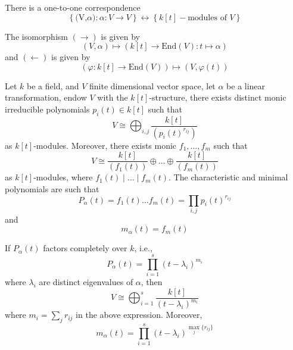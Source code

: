 \documentclass[openany]{book}
\begin{document}
\begin{prop}
    There is a one-to-one correspondence 
    \begin{equation*}
        \left\{\text{(V,$\alpha$)}: \alpha:V\to V\right\}\leftrightarrow \left\{k[t]-\text{modules of } V\right\}
    \end{equation*}
\end{prop}
The isomorphism $(\rightarrow)$ is given by 
\begin{equation*}
    (V,\alpha)\mapsto (k[t]\to\text{End}(V): t\mapsto\alpha)
\end{equation*}
and $(\leftarrow)$ is given by 
\begin{equation*}
    \left(\varphi:k[t]\to\text{End}(V)\right)\mapsto (V,\varphi(t))
\end{equation*}



\begin{prop}
    Let $k$ be a field, and $V$ finite dimensional vector space, let $\alpha$ be a linear transformation, endow $V$ with the $k[t]$-structure, there exists distinct monic irreducible polynomials $p_i(t)\in k[t]$ such that 
    \begin{equation*}
        V\cong\bigoplus_{i,j}\frac{k[t]}{(p_i(t)^{r_{ij}})}
    \end{equation*}
    as $k[t]$-modules. Moreover, there exists monic $f_1,\dots, f_m$ such that 
    \begin{equation*}
        V\cong\frac{k[t]}{(f_1(t))}\oplus\dots\oplus\frac{k[t]}{(f_m(t))}
    \end{equation*}
    as $k[t]$-modules, where $f_1(t)\mid\dots\mid f_m(t)$. The characteristic and minimal polynomials are such that 
    \begin{equation*}
        P_\alpha(t)=f_1(t)\dots f_m(t)=\prod_{i,j}p_i(t)^{r_{ij}}
    \end{equation*}
    and 
    \begin{equation*}
        m_\alpha(t)=f_m(t)
    \end{equation*}
\end{prop}

\begin{prop}
    If $P_\alpha(t)$ factors completely over $k$, i.e., 
    \begin{equation*}
        P_\alpha(t)=\prod_{i=1}^s(t-\lambda_i)^{m_i}
    \end{equation*}
    where $\lambda_i$ are distinct eigenvalues of $\alpha$, then
    \begin{equation*}
        V\cong\bigoplus_{i=1}^s\frac{k[t]}{(t-\lambda_i)^{m_i}}
    \end{equation*}
    where $m_i=\sum_jr_{ij}$ in the above expression. Moreover, 
    \begin{equation*}
        m_\alpha(t)=\prod_{i=1}^s(t-\lambda_i)^{\max_j\{r_{ij}\}}
    \end{equation*}
\end{prop}
\end{document}

